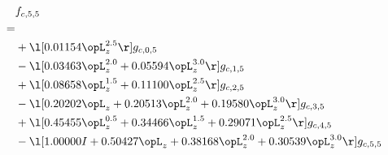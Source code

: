 \begin{alignat}{2} 
\label{eq:f_55_0} 
& f_{c,5,5} \nonumber \\ 
 = \\ 
& + \l[  0.01154 \opL_z^{2.5}  \r] g_{c,0,5} \nonumber \\ 
& - \l[  0.03463 \opL_z^{2.0} +  0.05594 \opL_z^{3.0}  \r] g_{c,1,5} \nonumber \\ 
& + \l[  0.08658 \opL_z^{1.5} +  0.11100 \opL_z^{2.5}  \r] g_{c,2,5} \nonumber \\ 
& - \l[  0.20202 \opL_z +  0.20513 \opL_z^{2.0} +  0.19580 \opL_z^{3.0}  \r] g_{c,3,5} \nonumber \\ 
& + \l[  0.45455 \opL_z^{0.5} +  0.34466 \opL_z^{1.5} +  0.29071 \opL_z^{2.5}  \r] g_{c,4,5} \nonumber \\ 
& - \l[  1.00000 I +  0.50427 \opL_z +  0.38168 \opL_z^{2.0} +  0.30539 \opL_z^{3.0}  \r] g_{c,5,5} \nonumber \\ 
\end{alignat} 


